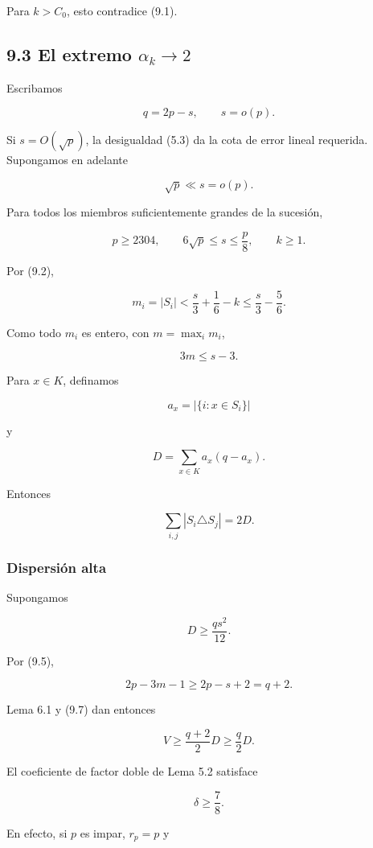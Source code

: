 \documentclass[spanish,11pt,a4paper]{article}
\begin{document}
Para \(k>C_0\), esto contradice (9.1).

\subsection{\texorpdfstring{9.3 El extremo
\(\alpha_k\to2\)}{9.3 El extremo \textbackslash alpha\_k\textbackslash to2}}\label{el-extremo-alpha_kto2}

Escribamos

\[
q=2p-s,
\qquad
s=o(p).
\]

Si \(s=O(\sqrt p)\), la desigualdad (5.3) da la cota de error lineal
requerida. Supongamos en adelante

\[
\sqrt p\ll s=o(p).
\tag{9.3}
\]

Para todos los miembros suficientemente grandes de la sucesión,

\[
p\ge2304,
\qquad
6\sqrt p\le s\le\frac p8,
\qquad
k\ge1.
\tag{9.4}
\]

Por (9.2),

\[
m_i=|S_i|
<
\frac s3+\frac16-k
\le
\frac s3-\frac56.
\]

Como todo \(m_i\) es entero, con \(m=\max_i m_i\),

\[
\boxed{3m\le s-3}.
\tag{9.5}
\]

Para \(x\in K\), definamos

\[
a_x=|\{i:x\in S_i\}|
\]

y

\[
D=\sum_{x\in K}a_x(q-a_x).
\tag{9.6}
\]

Entonces

\[
\sum_{i,j}|S_i\triangle S_j|=2D.
\tag{9.7}
\]

\subsubsection{Dispersión alta}\label{dispersiuxf3n-alta}

Supongamos

\[
D\ge\frac{qs^2}{12}.
\tag{9.8}
\]

Por (9.5),

\[
2p-3m-1\ge2p-s+2=q+2.
\]

Lema 6.1 y (9.7) dan entonces

\[
V
\ge
\frac{q+2}{2}D
\ge
\frac q2D.
\tag{9.9}
\]

El coeficiente de factor doble de Lema 5.2 satisface

\[
\boxed{\delta\ge\frac78}.
\tag{9.10}
\]

En efecto, si \(p\) es impar, \(r_p=p\) y
\end{document}
